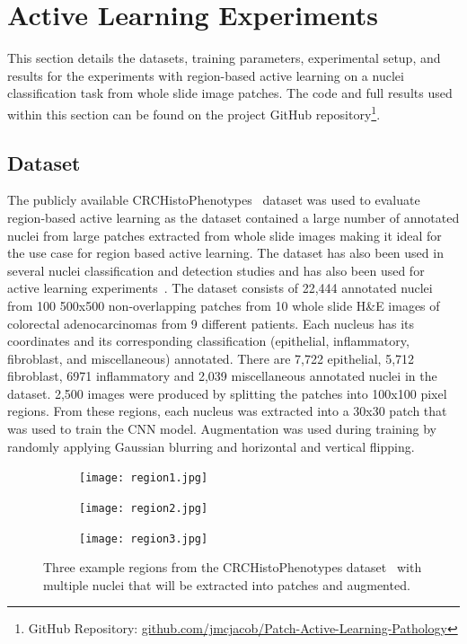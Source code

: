 \section{Active Learning Experiments}
This section details the datasets, training parameters, experimental setup, and results for the experiments with region-based active learning on a nuclei classification task from whole slide image patches. The code and full results used within this section can be found on the project GitHub repository\footnote{GitHub Repository: \url{github.com/jmcjacob/Patch-Active-Learning-Pathology}}.

\subsection{Dataset}
The publicly available CRCHistoPhenotypes~\citep{sirinukunwattana2016locality} dataset was used to evaluate region-based active learning as the dataset contained a large number of annotated nuclei from large patches extracted from whole slide images making it ideal for the use case for region based active learning. The dataset has also been used in several nuclei classification and detection studies and has also been used for active learning experiments~\citep{shao2018deep}. The dataset consists of 22,444 annotated nuclei from 100 500x500 non-overlapping patches from 10 whole slide H\&E images of colorectal adenocarcinomas from 9 different patients. Each nucleus has its coordinates and its corresponding classification (epithelial, inflammatory, fibroblast, and miscellaneous) annotated. There are 7,722 epithelial, 5,712 fibroblast, 6971 inflammatory and 2,039 miscellaneous annotated nuclei in the dataset. 2,500 images were produced by splitting the patches into 100x100 pixel regions. From these regions, each nucleus was extracted into a 30x30 patch that was used to train the CNN model. Augmentation was used during training by randomly applying Gaussian blurring and horizontal and vertical flipping.

\begin{figure}[t!]
	\centering
	\begin{subfigure}{0.3\textwidth}
		\texttt{[image: region1.jpg]}
	\end{subfigure}
	\begin{subfigure}{0.3\textwidth}
		\texttt{[image: region2.jpg]}
	\end{subfigure}
	\begin{subfigure}{0.3\textwidth}
		\texttt{[image: region3.jpg]}
	\end{subfigure}
	\caption{Three example regions from the CRCHistoPhenotypes dataset~\cite{sirinukunwattana2016locality} with multiple nuclei that will be extracted into patches and augmented.}
	\label{fig:region_example}
\end{figure}

